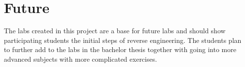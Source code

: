 \section{Future}
The labs created in this project are a base for future labs and should show participating students the initial steps of reverse engineering. The students plan to further add to the labs in the bachelor thesis together with going into more advanced subjects with more complicated exercises. 
